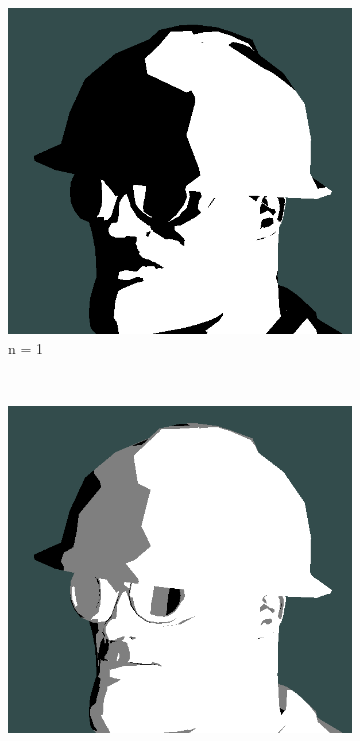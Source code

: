\begin{figure}[h]
    \centering
    \begin{subfigure}[b]{0.15\textwidth}
        \includegraphics[width=\textwidth]{img/cel-shading-n1.png}
        \caption{n = 1}
        \label{fig:cel-shading-n1}
    \end{subfigure}
    ~
    \begin{subfigure}[b]{0.15\textwidth}
        \includegraphics[width=\textwidth]{img/cel-shading-n2.png}

\end{subfigure}
\end{figure}
